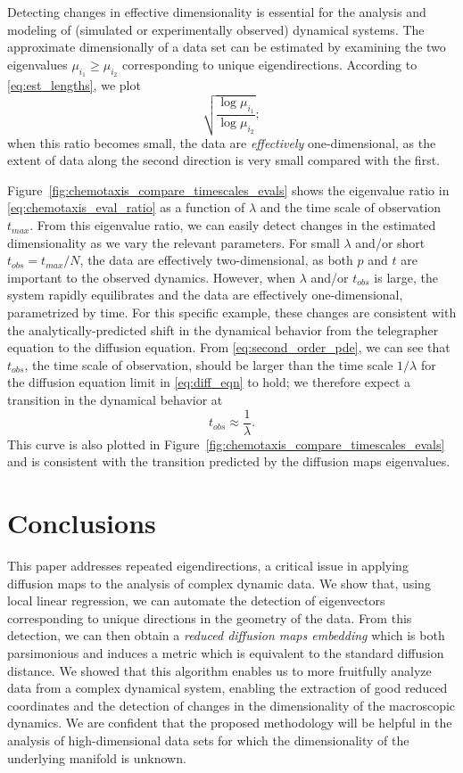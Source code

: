 \documentclass[3p]{elsarticle}
\begin{document}
Detecting changes in effective dimensionality is essential for the analysis and modeling of (simulated or experimentally observed) dynamical systems.
%
The approximate dimensionally of a data set can be estimated by examining the 
two eigenvalues $\mu_{i_1} \ge \mu_{i_2}$ corresponding to unique eigendirections.
%
According to \eqref{eq:est_lengths}, we plot
\begin{equation}\label{eq:chemotaxis_eval_ratio}
 \sqrt{\frac{\log \mu_{i_1}}{\log \mu_{i_2}}} ;
\end{equation}
when this ratio becomes small, the data are {\em effectively} one-dimensional, as the extent of data along the second direction is very 
small compared with the first.

Figure~\ref{fig:chemotaxis_compare_timescales_evals} shows the eigenvalue ratio in \eqref{eq:chemotaxis_eval_ratio} as 
a function of $\lambda$ and the time scale of observation $t_{max}$.
%
From this eigenvalue ratio, we can easily detect changes in the estimated dimensionality as we vary the relevant parameters.
%
For small $\lambda$ and/or short $t_{obs} = t_{max} / N$, the data are effectively two-dimensional, as both $p$ and $t$ are important to the observed dynamics.
%
However, when $\lambda$ and/or $t_{obs}$ is large, the system rapidly equilibrates and the data are effectively one-dimensional, parametrized by time.
%
For this specific example, these changes are consistent with the analytically-predicted  shift in the dynamical behavior from the telegrapher equation to the diffusion equation.
%
From \eqref{eq:second_order_pde}, we can see that $t_{obs}$, the time scale of observation, should be larger than the time scale $1/\lambda$ for the diffusion equation limit in \eqref{eq:diff_eqn} to hold; we therefore expect a transition in the dynamical behavior at
\begin{equation}
t_{obs} \approx \frac{1}{\lambda}.
\end{equation}
%
This curve is also plotted in Figure~\ref{fig:chemotaxis_compare_timescales_evals} and is consistent with the transition predicted by the diffusion maps eigenvalues.

\section{Conclusions}

This paper addresses repeated eigendirections, a critical issue in applying diffusion maps to the analysis of complex dynamic data.
%
We show that, using local linear regression, we can automate the detection of eigenvectors corresponding to unique directions in the
geometry of the data.
%
From this detection, we can then obtain a {\em reduced diffusion maps embedding} which is both parsimonious and 
induces a metric which is equivalent to the standard diffusion distance.
%
We showed that this algorithm enables us to more fruitfully analyze data from a complex dynamical system, 
enabling the extraction of good reduced coordinates and the detection of changes in the dimensionality of the macroscopic dynamics.
%
We are confident that the proposed methodology will be helpful in the analysis of high-dimensional data sets for which 
the dimensionality of the underlying manifold is unknown.
\end{document}
